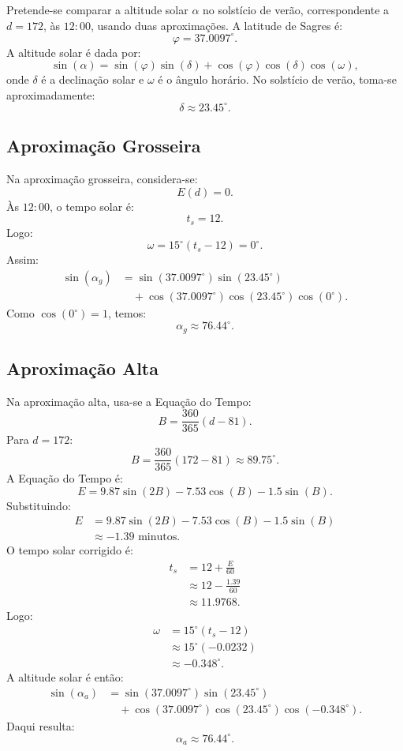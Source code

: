 \documentclass[12pt,a4paper]{report}
\begin{document}
Pretende-se comparar a altitude solar \(\alpha\) no solstício de verão, correspondente a \(d=172\), às \(12:00\), usando duas aproximações.
A latitude de Sagres é:
\[
\varphi = 37.0097^\circ.
\]
A altitude solar é dada por:
\[
\sin(\alpha)
=
\sin(\varphi)\sin(\delta)
+
\cos(\varphi)\cos(\delta)\cos(\omega),
\]
onde \(\delta\) é a declinação solar e \(\omega\) é o ângulo horário.
No solstício de verão, toma-se aproximadamente:
\[
\delta \approx 23.45^\circ.
\]
\subsection*{Aproximação Grosseira}
Na aproximação grosseira, considera-se:
\[
E(d)=0.
\]
Às \(12:00\), o tempo solar é:
\[
t_s=12.
\]
Logo:
\[
\omega = 15^\circ(t_s-12)=0^\circ.
\]
Assim:
\[
\begin{aligned}
\sin(\alpha_g)
&=
\sin(37.0097^\circ)\sin(23.45^\circ) \\
&\quad+
\cos(37.0097^\circ)\cos(23.45^\circ)\cos(0^\circ).
\end{aligned}
\]
Como \(\cos(0^\circ)=1\), temos:
\[
\alpha_g \approx 76.44^\circ.
\]
\subsection*{Aproximação Alta}
Na aproximação alta, usa-se a Equação do Tempo:
\[
B=\frac{360}{365}(d-81).
\]
Para \(d=172\):
\[
B=\frac{360}{365}(172-81)\approx 89.75^\circ.
\]
A Equação do Tempo é:
\[
E = 9.87\sin(2B)-7.53\cos(B)-1.5\sin(B).
\]
Substituindo:
\[
\begin{aligned}
E
&= 9.87\sin(2B)-7.53\cos(B)-1.5\sin(B) \\
&\approx -1.39 \text{ minutos}.
\end{aligned}
\]
O tempo solar corrigido é:
\[
\begin{aligned}
t_s
&= 12+\frac{E}{60} \\
&\approx 12-\frac{1.39}{60} \\
&\approx 11.9768.
\end{aligned}
\]
Logo:
\[
\begin{aligned}
\omega
&= 15^\circ(t_s-12) \\
&\approx 15^\circ(-0.0232) \\
&\approx -0.348^\circ.
\end{aligned}
\]
A altitude solar é então:
\[
\begin{aligned}
\sin(\alpha_a)
&=
\sin(37.0097^\circ)\sin(23.45^\circ) \\
&\quad+
\cos(37.0097^\circ)\cos(23.45^\circ)\cos(-0.348^\circ).
\end{aligned}
\]
Daqui resulta:
\[
\alpha_a \approx 76.44^\circ.
\]
\end{document}
